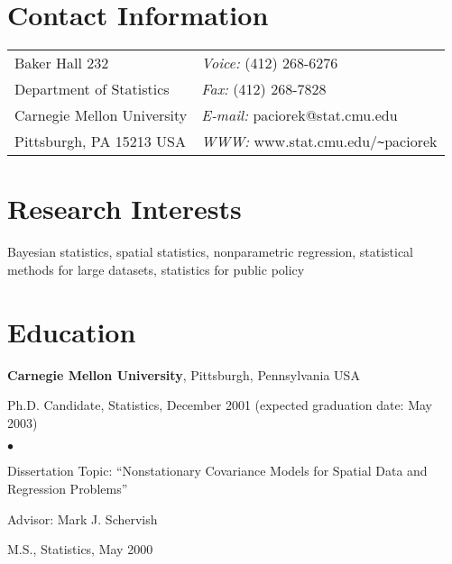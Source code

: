 \documentclass[margin,line]{res}
\newenvironment{list1}{
  \begin{list}{\ding{113}}{%
      \setlength{\itemsep}{0in}
      \setlength{\parsep}{0in} \setlength{\parskip}{0in}
      \setlength{\topsep}{0in} \setlength{\partopsep}{0in} 
      \setlength{\leftmargin}{0.17in}}}{\end{list}}
\newenvironment{list2}{
  \begin{list}{$\bullet$}{%
      \setlength{\itemsep}{0in}
      \setlength{\parsep}{0in} \setlength{\parskip}{0in}
      \setlength{\topsep}{0in} \setlength{\partopsep}{0in} 
      \setlength{\leftmargin}{0.2in}}}{\end{list}}
\begin{document}

\begin{resume}
\section{\sc Contact Information}
\vspace{.05in}
\begin{tabular}{@{}p{2in}p{4in}}
Baker Hall 232             & {\it Voice:}  (412) 268-6276 \\            
Department of Statistics   & {\it Fax:}    (412) 268-7828 \\         
Carnegie Mellon University & {\it E-mail:}  paciorek@stat.cmu.edu\\       
Pittsburgh, PA  15213 USA  & {\it WWW:} www.stat.cmu.edu/\verb+~+paciorek \\     
\end{tabular}


\section{\sc Research Interests}
Bayesian statistics, spatial statistics, nonparametric regression,
statistical methods for large datasets, statistics for public policy

\section{\sc Education}
{\bf Carnegie Mellon University}, Pittsburgh, Pennsylvania USA\\
\vspace*{-.1in}
\begin{list1}
\item[] Ph.D. Candidate, Statistics, December 2001 (expected
  graduation date: May 2003)
\begin{list2}
\vspace*{.05in}
\item Dissertation Topic:  ``Nonstationary Covariance Models for
  Spatial Data and Regression Problems'' 
\item Advisor:  Mark J. Schervish
\end{list2}
\vspace*{.05in}
\item[] M.S., Statistics,  May 2000
\end{list1}


\end{resume}
\end{document}
